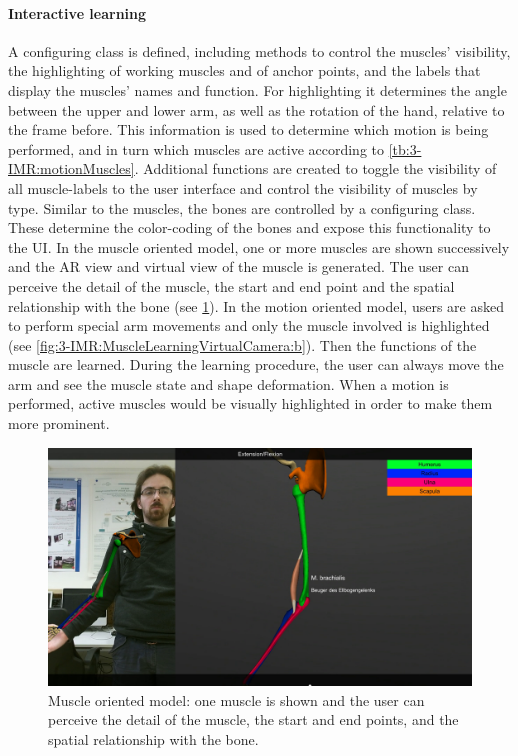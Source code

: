 \paragraph{Interactive learning}
A configuring class is defined, including methods to control the muscles' visibility, the highlighting of working muscles and of anchor points, and the labels that display the muscles' names and function. For highlighting it determines the angle between the upper and lower arm, as well as the rotation of the hand, relative to the frame before. This information is used to determine which motion is being performed, and in turn which muscles are active according to \tablename{\ref{tb:3-IMR:motionMuscles}}. 
Additional functions are created to toggle the visibility of all muscle-labels to the user interface and control the visibility of muscles by type.
Similar to the muscles, the bones are controlled by a configuring class. These determine the color-coding of the bones and expose this functionality to the UI.
In the muscle oriented model, one or more muscles are shown successively and the AR view and virtual view of the muscle is generated. The user can perceive the detail of the muscle, the start and end point and the spatial relationship with the bone (see \figurename{\ref{fig:3-IMR:muscleModelLearning}}). 
In the motion oriented model, users are asked to perform special arm movements and only the muscle involved is highlighted (see \figurename{\ref{fig:3-IMR:MuscleLearningVirtualCamera:b}}). Then the functions of the muscle are learned. 
During the learning procedure, the user can always move the arm and see the muscle state and shape deformation.
When a motion is performed, active muscles would be visually highlighted in order to make them more prominent.
\begin{figure}
\centering
\includegraphics[width=0.8\linewidth]{figures/3-IMR/muscleModel}
\caption{Muscle oriented model: one muscle is shown and the user can perceive the detail of the muscle, the start and end points, and the spatial relationship with the bone.}
\label{fig:3-IMR:muscleModelLearning}
\end{figure}


